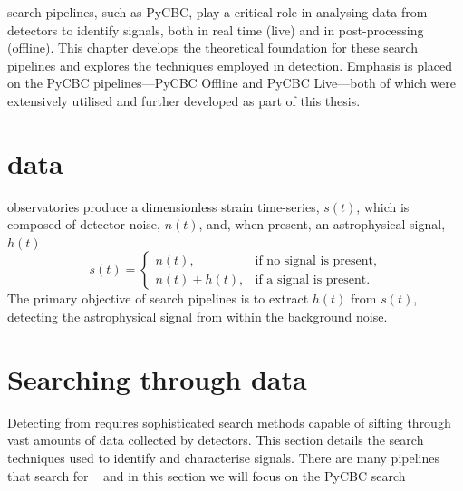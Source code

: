 



\Gwadj search pipelines, such as PyCBC, play a critical role in analysing data from detectors to identify \gwadj signals, both in real time (live) and in post-processing (offline). This chapter develops the theoretical foundation for these search pipelines and explores the techniques employed in \gwadj detection. Emphasis is placed on the PyCBC pipelines---PyCBC Offline and PyCBC Live---both of which were extensively utilised and further developed as part of this thesis.

\section{\label{2:sec:gw-data}\Gwadj data}

\Gwadj observatories produce a dimensionless strain time-series, $s(t)$, which is composed of detector noise, $n(t)$, and, when present, an astrophysical \gwadj signal, $h(t)$
%
\begin{equation}
    s(t) =
    \begin{cases}
        n(t), & \text{if no signal is present}, \\
        n(t) + h(t), & \text{if a signal is present}.
    \end{cases}
\end{equation}
%
The primary objective of \gwadj search pipelines is to extract $h(t)$ from $s(t)$, detecting the astrophysical signal from within the background noise.

\section{\label{2:sec:search-methods}Searching through \gwadj data}

Detecting \gws from \cbcs requires sophisticated search methods capable of sifting through vast amounts of data collected by \gwadj detectors. This section details the search techniques used to identify and characterise \gwadj signals. There are many pipelines that search for \gws~\cite{pipelines, PyCBC:2017, GstLAL:2020, SPIIR:2020, MBTA:2021, cWB:2020, oLIB:2015, MLy:2020qax} and in this section we will focus on the PyCBC search~\cite{PyCBC:2016, PyCBC:2017, PyCBC_package:2021}

